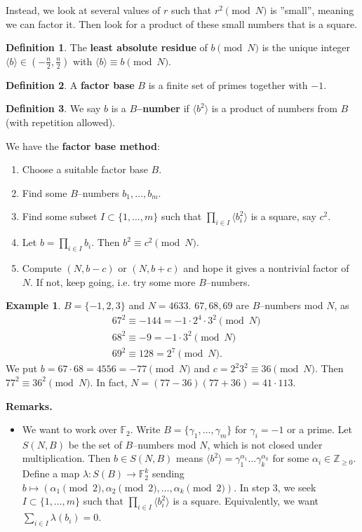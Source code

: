 \documentclass{article}
\theoremstyle{definition}
\newtheorem{example}{Example}[section]
\newtheorem{defn}{Definition}[section]
\begin{document}
Instead, we look at several values of $r$ such that $r^2 \pmod{N}$ is ''small'', meaning we can factor it. Then look for a product of these small numbers that is a square.
\begin{defn}
    The \textbf{least absolute residue} of $b \pmod{N}$ is the unique integer $\langle b \rangle \in (-\frac{n}{2}, \frac{n}{2})$ with $\langle b \rangle \equiv b \pmod{N}$.
\end{defn}
\begin{defn}
    A \textbf{factor base} $B$ is a finite set of primes together with $-1$.
\end{defn}
\begin{defn}
    We say $b$ is a \textbf{$B$--number} if $\langle b^2 \rangle$ is a product of numbers from $B$ (with repetition allowed). 
\end{defn}
We have the \textbf{factor base method}:
\begin{enumerate}[(1)]
    \item Choose a suitable factor base $B$.
    \item Find some $B$--numbers $b_1,\ldots,b_m$.
    \item Find some subset $I \subset \{1,\ldots,m\}$ such that $\prod_{i \in I}^{} \langle b_i^2 \rangle$ is a square, say $c^2$.
    \item Let $b=\prod_{i \in I}^{} b_i$. Then $b^2 \equiv c^2 \pmod{N}$.
    \item Compute $(N,b-c)$ or $(N,b+c)$ and hope it gives a nontrivial factor of $N$. If not, keep going, i.e. try some more $B$--numbers.
\end{enumerate} 
\begin{example}
    $B=\{-1,2,3\}$ and $N=4633$. $67,68,69$ are $B$--numbers mod $N$, as 
    \begin{align*}
        &67^2 \equiv -144 = -1 \cdot 2^{4} \cdot 3^2\pmod{N}\\
        &68^2 \equiv -9 = -1 \cdot 3^2 \pmod{N}\\
        &69^2 \equiv 128  = 2^7 \pmod{N}.
    \end{align*}
    We put $b=67\cdot 68 = 4556 = -77 \pmod{N}$ and $c = 2^2 3^2 \equiv 36 \pmod{N}$. Then $77^2 \equiv 36^2 \pmod{N}$. In fact, $N=(77-36)(77+36)=41\cdot 113$.
\end{example}
\textbf{Remarks.}
\begin{itemize}
    \item We want to work over $\mathbb{F}_2$. Write $B = \{\gamma_1,\ldots,\gamma_m\}$ for $\gamma_i=-1$ or a prime. Let $S(N,B)$ be the set of $B$--numbers mod $N$, which is not closed under multiplication. Then $b \in S(N,B)$ means $\langle b^2 \rangle = \gamma_1^{\alpha_1}\ldots \gamma_k^{\alpha_{k}}$ for some $\alpha_i \in \mathbb{Z}_{\ge 0}$. Define a map $\lambda : S(B) \to \mathbb{F}_2^k$ sending $b \mapsto (\alpha_1 \pmod{2}, \alpha_2 \pmod{2},\ldots,\alpha_k \pmod{2})$. In step 3, we seek $I \subset \{1,\ldots,m\}$ such that $\prod_{i \in I}^{} \langle b_i^2 \rangle$ is a square. Equivalently, we want $\sum_{i \in I}^{} \lambda(b_i) = 0$.
\end{itemize}
\end{document}
